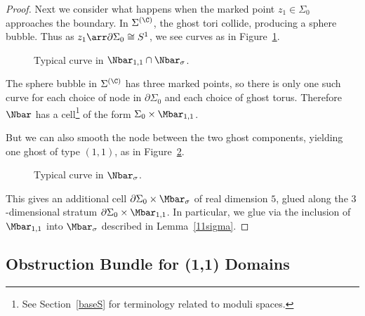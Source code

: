 \begin{proposition}
\begin{proof}
Next we consider what happens when the marked point $z_1 \in \Sigma_0$ approaches the boundary. In $\Sigma^{(\C)}$, the ghost tori collide, producing a sphere bubble. Thus as $z_1 \arr \partial\Sigma_0 \cong S^1$, we see curves as in Figure~\ref{pic11sigma}.
\begin{figure}[ht]
\centering
{}
\caption{Typical curve in $\Nbar_{1,1} \cap \Nbar_\sigma$.}
\label{pic11sigma}
\end{figure}
The sphere bubble in $\Sigma^{(\C)}$ has three marked points, so there is only one such curve for each choice of node in $\partial\Sigma_0$ and each choice of ghost torus. Therefore $\Nbar$ has a cell\footnote{See Section~\ref{baseS} for terminology related to moduli spaces.} of the form $\Sigma_0 \times \Mbar_{1,1}$.

But we can also smooth the node between the two ghost components, yielding one ghost of type $(1,1)$, as in Figure~\ref{m11}.
\begin{figure}[ht]
\centering
{}
\caption{Typical curve in $\Nbar_\sigma$.}
\label{m11}
\end{figure}
This gives an additional cell $\partial\Sigma_0 \times \Mbar_\sigma$ of real dimension $5$, glued along the $3$-dimensional stratum $\partial\Sigma_0 \times \Mbar_{1,1}$. In particular, we glue via the inclusion of $\Mbar_{1,1}$ into $\Mbar_\sigma$ described in Lemma~\ref{11sigma}.
\end{proof}
\end{proposition}

\subsection{Obstruction Bundle for (1,1) Domains} \label{ob11ss}

